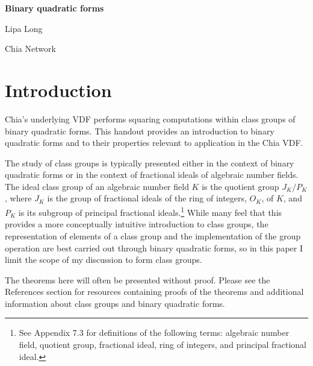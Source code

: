 \documentclass{article}
\theoremstyle{definition}
\theoremstyle{theorem}
\theoremstyle{example}
\theoremstyle{corollary}
\begin{document}
\begin{center}
\LARGE{\textbf{Binary quadratic forms}}

\bigskip

\normalsize{Lipa Long}

\medskip

Chia Network
\end{center}



\bigskip
\bigskip
\bigskip




\bigskip

\section{Introduction}

\bigskip

Chia's underlying VDF performs squaring computations within class groups of binary quadratic forms. This handout provides an introduction to binary quadratic forms and to their properties relevant to application in the Chia VDF.

\bigskip

The study of class groups is typically presented either in the context of binary quadratic forms or in the context of fractional ideals of algebraic number fields. The ideal class group of an algebraic number field \(K\) is the quotient group \(J_{K}/P_{K}\), where \(J_{K}\) is the group of fractional ideals of the ring of integers, \(O_{K}\), of \(K\), and \(P_{K}\) is its subgroup of principal fractional ideals.\footnote{See Appendix 7.3 for definitions of the following terms: algebraic number field, quotient group, fractional ideal, ring of integers, and principal fractional ideal.} While many feel that this provides a more conceptually intuitive introduction to class groups, the representation of elements of a class group and the implementation of the group operation are best carried out through binary quadratic forms, so in this paper I limit the scope of my discussion to form class groups.

\bigskip

The theorems here will often be presented without proof. Please see the References section for resources containing proofs of the theorems and additional information about class groups and binary quadratic forms.








\bigskip
\end{document}
